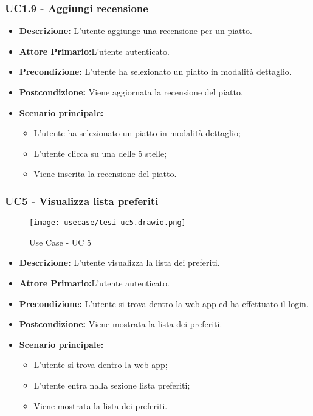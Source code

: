 \subsubsection{UC1.9 - Aggiungi recensione}
\begin{itemize}
    \item \textbf{Descrizione:} L'utente aggiunge una recensione per un piatto.
    \item \textbf{Attore Primario:}L'utente autenticato.
    \item \textbf{Precondizione:} L'utente ha selezionato un piatto in modalità dettaglio.
    \item \textbf{Postcondizione:} Viene aggiornata la recensione del piatto.
    \item \textbf{Scenario principale:}
    \begin{itemize}
        \item L'utente ha selezionato un piatto in modalità dettaglio;
        \item L'utente clicca su una delle 5 stelle;
        \item Viene inserita la recensione del piatto.
    \end{itemize}
\end{itemize}
\subsubsection{UC5 - Visualizza lista preferiti}
\begin{figure}[H]
    \centering
    \texttt{[image: usecase/tesi-uc5.drawio.png]}
    \caption{Use Case - UC 5}
\end{figure}
\begin{itemize}
    \item \textbf{Descrizione:} L'utente visualizza la lista dei preferiti.
    \item \textbf{Attore Primario:}L'utente autenticato.
    \item \textbf{Precondizione:} L'utente si trova dentro la web-app ed ha effettuato il login.
    \item \textbf{Postcondizione:} Viene mostrata la lista dei preferiti.
    \item \textbf{Scenario principale:}
    \begin{itemize}
        \item L'utente si trova dentro la web-app;
        \item L'utente entra nalla sezione lista preferiti;
        \item Viene mostrata la lista dei preferiti.
    \end{itemize}
\end{itemize}
